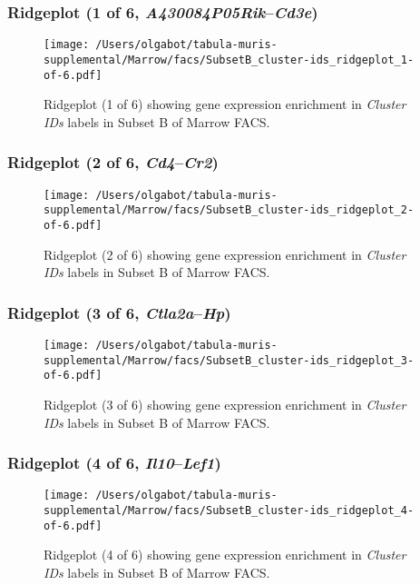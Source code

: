 \clearpage

\subsubsection{Ridgeplot (1 of 6, \emph{A430084P05Rik}--\emph{Cd3e})}
\begin{figure}[h]
\centering
\texttt{[image: /Users/olgabot/tabula-muris-supplemental/Marrow/facs/SubsetB\_cluster-ids\_ridgeplot\_1-of-6.pdf]}

\caption{ Ridgeplot (1 of 6)  showing gene expression enrichment in \emph{Cluster IDs} labels in Subset B of Marrow FACS. }
\end{figure}


\clearpage

\subsubsection{Ridgeplot (2 of 6, \emph{Cd4}--\emph{Cr2})}
\begin{figure}[h]
\centering
\texttt{[image: /Users/olgabot/tabula-muris-supplemental/Marrow/facs/SubsetB\_cluster-ids\_ridgeplot\_2-of-6.pdf]}

\caption{ Ridgeplot (2 of 6)  showing gene expression enrichment in \emph{Cluster IDs} labels in Subset B of Marrow FACS. }
\end{figure}


\clearpage

\subsubsection{Ridgeplot (3 of 6, \emph{Ctla2a}--\emph{Hp})}
\begin{figure}[h]
\centering
\texttt{[image: /Users/olgabot/tabula-muris-supplemental/Marrow/facs/SubsetB\_cluster-ids\_ridgeplot\_3-of-6.pdf]}

\caption{ Ridgeplot (3 of 6)  showing gene expression enrichment in \emph{Cluster IDs} labels in Subset B of Marrow FACS. }
\end{figure}


\clearpage

\subsubsection{Ridgeplot (4 of 6, \emph{Il10}--\emph{Lef1})}
\begin{figure}[h]
\centering
\texttt{[image: /Users/olgabot/tabula-muris-supplemental/Marrow/facs/SubsetB\_cluster-ids\_ridgeplot\_4-of-6.pdf]}

\caption{ Ridgeplot (4 of 6)  showing gene expression enrichment in \emph{Cluster IDs} labels in Subset B of Marrow FACS. }
\end{figure}


